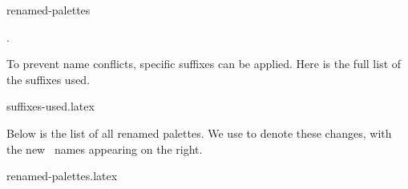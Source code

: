 \documentclass{tutodoc}
\begin{document}
\appendixsection{\palsrenamed}
                {renamed-palettes}  %

\begin{tdocimp}
    \appendixaboutpalname.
\end{tdocimp}


\smallskip


To prevent name conflicts, specific suffixes can be applied. Here is the full list of the suffixes used.

{suffixes-used.latex}


\smallskip


Below is the list of all renamed palettes. We use \boxed{{\Rightarrow}\vphantom{pM}} to denote these changes, with the new \thisproj\ names appearing on the right.

{renamed-palettes.latex}
\end{document}

